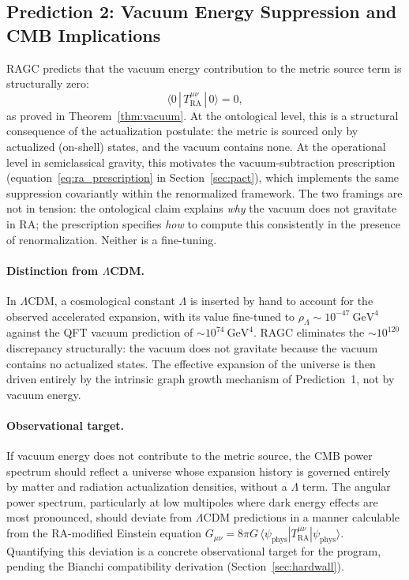 \documentclass[11pt,a4paper]{article}
\theoremstyle{plain}
\theoremstyle{definition}
\theoremstyle{remark}
\newcommand{\Tact}{T^{\mu\nu}_{\mathrm{RA}}}
\begin{document}
\subsection{Prediction 2: Vacuum Energy Suppression and CMB Implications}

RAGC predicts that the vacuum energy contribution to the metric source term is
structurally zero:
\begin{equation}
  \langle 0 \,|\, \Tact \,|\, 0 \rangle = 0,
\end{equation}
as proved in Theorem~\ref{thm:vacuum}. At the ontological level,
this is a structural consequence of the actualization postulate: the metric is
sourced only by actualized (on-shell) states, and the vacuum contains none.
At the operational level in semiclassical gravity, this motivates the
vacuum-subtraction prescription (equation~\eqref{eq:ra_prescription} in
Section~\ref{sec:pact}), which implements the same suppression covariantly
within the renormalized framework. The two framings are not in tension:
the ontological claim explains \emph{why} the vacuum does not gravitate in RA;
the prescription specifies \emph{how} to compute this consistently in the
presence of renormalization. Neither is a fine-tuning.

\paragraph{Distinction from $\Lambda$CDM.}
In $\Lambda$CDM, a cosmological constant $\Lambda$ is inserted by hand to account
for the observed accelerated expansion, with its value fine-tuned to $\rho_\Lambda
\sim 10^{-47}~\mathrm{GeV}^4$ against the QFT vacuum prediction of $\sim
10^{74}~\mathrm{GeV}^4$. RAGC eliminates the $\sim\!10^{120}$ discrepancy
structurally: the vacuum does not gravitate because the vacuum contains no
actualized states. The effective expansion of the universe is then driven entirely
by the intrinsic graph growth mechanism of Prediction~1, not by vacuum energy.

\paragraph{Observational target.}
If vacuum energy does not contribute to the metric source, the CMB power spectrum
should reflect a universe whose expansion history is governed entirely by matter
and radiation actualization densities, without a $\Lambda$ term. The angular power
spectrum, particularly at low multipoles where dark energy effects are most
pronounced, should deviate from $\Lambda$CDM predictions in a manner calculable
from the RA-modified Einstein equation
$G_{\mu\nu} = 8\pi G\,\langle\psi_{\mathrm{phys}}|\Tact|\psi_{\mathrm{phys}}\rangle$.
Quantifying this deviation is a concrete observational target for the program,
pending the Bianchi compatibility derivation (Section~\ref{sec:hardwall}).
\end{document}

